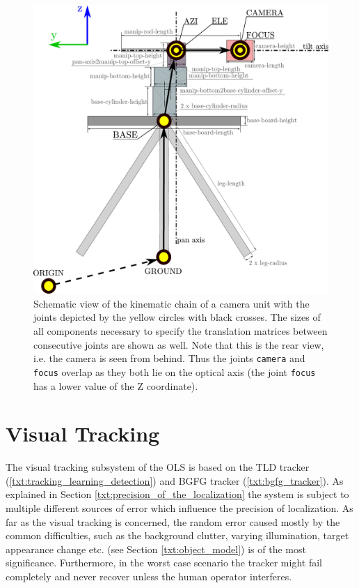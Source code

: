 \begin{figure}[htb]
	\centering
	\includegraphics[width=0.6\linewidth]{fig/camera_unit_kinematic_chain.pdf}
	\caption{Schematic view of the kinematic chain of a camera unit with the joints depicted by the yellow circles with black crosses. The sizes of all components necessary to specify the translation matrices between consecutive joints are shown as well. Note that this is the rear view, i.e. the camera is seen from behind. Thus the joints \texttt{camera} and \texttt{focus} overlap as they both lie on the optical axis (the joint \texttt{focus} has a lower value of the Z coordinate).}
	\label{fig:camera_unit_kinematic_chain}
\end{figure}


\section{Visual Tracking}

The visual tracking subsystem of the OLS is based on the TLD tracker (\ref{txt:tracking_learning_detection}) and BGFG tracker (\ref{txt:bgfg_tracker}). As explained in Section \ref{txt:precision_of_the_localization} the system is subject to multiple different sources of error which influence the precision of localization. As far as the visual tracking is concerned, the random error caused mostly by the common difficulties, such as the background clutter, varying illumination, target appearance change etc. (see Section \ref{txt:object_model}) is of the most significance. Furthermore, in the worst case scenario the tracker might fail completely and never recover unless the human operator interferes.

